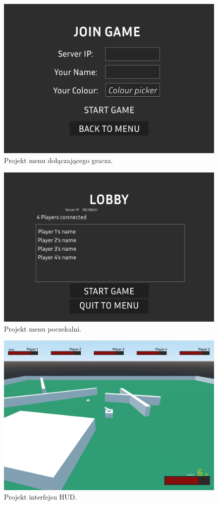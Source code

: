 \begin{figure}
    \centering
    \includegraphics[width=.8\linewidth]{Images/design/Join Menu.png}
    \caption{Projekt menu dołączającego gracza.}
    \label{fig:join_menu}
\end{figure}

\begin{figure}
    \centering
    \includegraphics[width=.8\linewidth]{Images/design/Lobby Menu.png}
    \caption{Projekt menu poczekalni.}
    \label{fig:lobby_menu}
\end{figure}

\begin{figure}
    \centering
    \includegraphics[width=.8\linewidth]{Images/design/Game View.png}
    \caption{Projekt interfejsu HUD.}
    \label{fig:game_view}
\end{figure}

